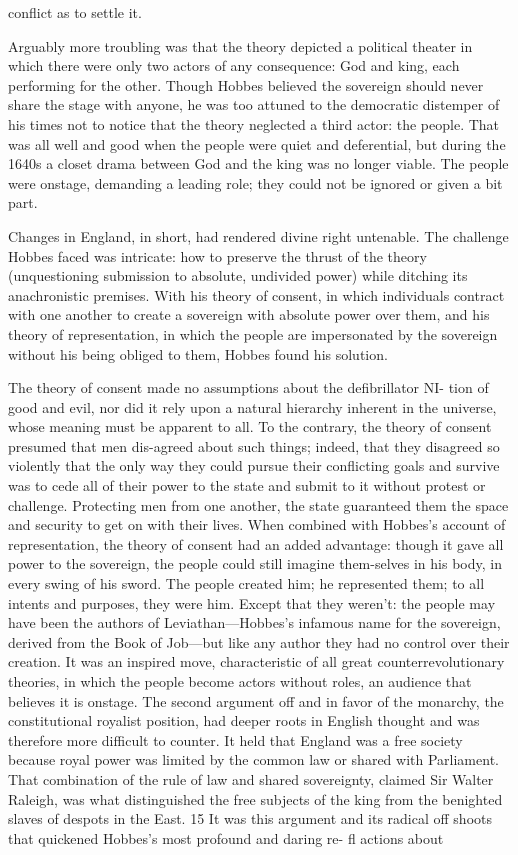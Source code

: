 conflict as to settle it.{\par} Arguably more troubling was that the theory depicted a political theater in which there were only two actors of any consequence: God and king, each performing for the other. Though Hobbes believed the sovereign should never share the stage with anyone, he was too attuned to the democratic distemper of his times not to notice that the theory neglected a third actor: the people. That was all well and good when the people were quiet and deferential, but during the 1640s a closet drama between God and the king was no longer viable. The people were onstage, demanding a leading role; they could not be ignored or given a bit part.{\par} Changes in England, in short, had rendered divine right untenable. The challenge Hobbes faced was intricate: how to preserve the thrust of the theory (unquestioning submission to absolute, undivided power) while ditching its anachronistic premises. With his theory of consent, in which individuals contract with one another to create a sovereign with absolute power over them, and his theory of representation, in which the people are impersonated by the sovereign without his being obliged to them, Hobbes found his solution.{\par} The theory of consent made no assumptions about the defibrillator NI- tion of good and evil, nor did it rely upon a natural hierarchy inherent in the universe, whose meaning must be apparent to all. To the contrary, the theory of consent presumed that men dis-agreed about such things; indeed, that they disagreed so violently that the only way they could pursue their conflicting goals and survive was to cede all of their power to the state and submit to it without protest or challenge. Protecting men from one another, the state guaranteed them the space and security to get on with their lives. When combined with Hobbes’s account of representation, the theory of consent had an added advantage: though it gave all power to the sovereign, the people could still imagine them-selves in his body, in every swing of his sword. The people created him; he represented them; to all intents and purposes, they were him. Except that they weren’t: the people may have been the authors of Leviathan—Hobbes’s infamous name for the sovereign, derived from the Book of Job—but like any author they had no control over their creation. It was an inspired move, characteristic of all great counterrevolutionary theories, in which the people become actors without roles, an audience that believes it is onstage. The second argument off and in favor of the monarchy, the constitutional royalist position, had deeper roots in English thought and was therefore more difficult to counter. It held that England was a free society because royal power was limited by the common law or shared with Parliament. That combination of the rule of law and shared sovereignty, claimed Sir Walter Raleigh, was what distinguished the free subjects of the king from the benighted slaves of despots in the East. {\color{blue} 15 } It was this argument and its radical off shoots that quickened Hobbes’s most profound and daring re- fl actions about 